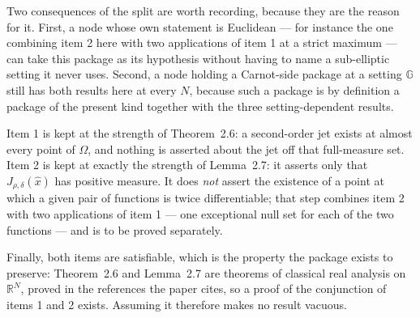 \begin{definition}
Two consequences of the split are worth recording, because they are the reason for it. First,
a node whose own statement is Euclidean --- for instance the one combining item 2 here with
two applications of item 1 at a strict maximum --- can take this package as its hypothesis
without having to name a sub-elliptic setting it never uses. Second, a node holding a
Carnot-side package at a setting $\mathbb G$ still has both results here at every $N$, because
such a package is by definition a package of the present kind together with the three
setting-dependent results.

Item 1 is kept at the strength of Theorem~2.6: a second-order jet exists at almost every
point of $\Omega$, and nothing is asserted about the jet off that full-measure set. Item 2 is
kept at exactly the strength of Lemma~2.7: it asserts only that $J_{\rho,\delta}(\hat x)$ has
positive measure. It does \emph{not} assert the existence of a point at which a given pair of
functions is twice differentiable; that step combines item 2 with two applications of item 1
--- one exceptional null set for each of the two functions --- and is to be proved separately.

Finally, both items are satisfiable, which is the property the package exists to preserve:
Theorem~2.6 and Lemma~2.7 are theorems of classical real analysis on $\mathbb R^{N}$,
proved in the references the paper cites, so a proof of the conjunction of items 1 and 2
exists. Assuming it therefore makes no result vacuous.
\end{definition}
